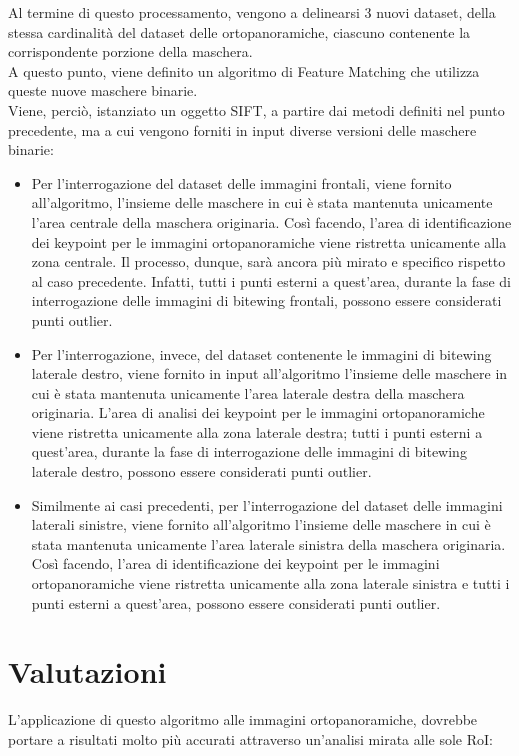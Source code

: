 \documentclass[12pt,a4paper,openright,twoside]{book}
\begin{document}
Al termine di questo processamento, vengono a delinearsi 3 nuovi dataset, della stessa cardinalità del dataset delle ortopanoramiche, ciascuno contenente la corrispondente porzione della maschera.\\

A questo punto, viene definito un algoritmo di Feature Matching che utilizza queste nuove maschere binarie.\\
Viene, perciò, istanziato un oggetto SIFT, a partire dai metodi definiti nel punto precedente, ma a cui vengono forniti in input diverse versioni delle maschere binarie:
\begin{itemize}
\item Per l'interrogazione del dataset delle immagini frontali, viene fornito all'algoritmo, l'insieme delle maschere in cui è stata mantenuta unicamente l'area centrale della maschera originaria. Così facendo, l'area di identificazione dei keypoint per le immagini ortopanoramiche viene ristretta unicamente alla zona centrale. Il processo, dunque, sarà ancora più mirato e specifico rispetto al caso precedente. Infatti, tutti i punti esterni a quest'area, durante la fase di interrogazione delle immagini di bitewing frontali, possono essere considerati punti outlier.
\item  Per l'interrogazione, invece, del dataset contenente le immagini di bitewing laterale destro, viene fornito in input all'algoritmo l'insieme delle maschere in cui è stata mantenuta unicamente l'area laterale destra della maschera originaria. L'area di analisi dei keypoint per le immagini ortopanoramiche viene ristretta unicamente alla zona laterale destra; tutti i punti esterni a quest'area, durante la fase di interrogazione delle immagini di bitewing laterale destro, possono essere considerati punti outlier.
\item Similmente ai casi precedenti, per l'interrogazione del dataset delle immagini laterali sinistre, viene fornito all'algoritmo l'insieme delle maschere in cui è stata mantenuta unicamente l'area laterale sinistra della maschera originaria. Così facendo, l'area di identificazione dei keypoint per le immagini ortopanoramiche viene ristretta unicamente alla zona laterale sinistra e tutti i punti esterni a quest'area, possono essere considerati punti outlier.
\end{itemize}


\section{Valutazioni}
L'applicazione di questo algoritmo alle immagini ortopanoramiche, dovrebbe portare a risultati molto più accurati attraverso un'analisi mirata alle sole RoI:
\end{document}
